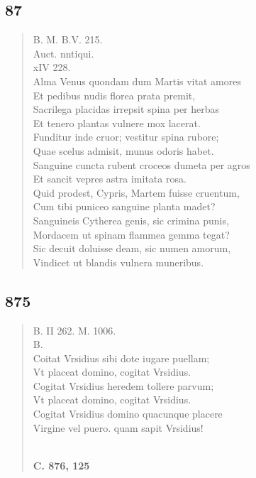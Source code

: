 \documentclass[11pt, a4paper]{report}
\begin{document}
            \subsection*{87}
      \begin{verse}
      B. M. B.V. 215. \\ Auct. nntiqui. \\ xIV 228. \\ Alma Venus  \lbrack quondam \rbrack  dum Martis vitat amores \\ Et pedibus nudis florea prata premit, \\ Sacrilega placidas irrepsit spina per herbas \\ Et tenero plantas vulnere mox lacerat. \\ Funditur inde cruor; vestitur spina rubore; \\ Quae scelus admisit, munus odoris habet. \\ Sanguine cuncta rubent croceos dumeta per agros \\ Et sancit vepres astra imitata rosa. \\ Quid prodest, Cypris, Martem fuisse cruentum, \\ Cum tibi puniceo sanguine planta madet? \\ Sanguineis Cytherea genis, sic crimina punis, \\ Mordacem ut spinam flammea gemma tegat? \\ Sic decuit doluisse deam, sic numen amorum, \\ Vindicet ut blandis vulnera muneribus. \\ 
      \end{verse}
  
            \subsection*{875}
      \begin{verse}
      B. II 262. M. 1006. \\ B. \\ Coitat Vrsidius sibi dote iugare puellam; \\ Vt placeat domino, cogitat Vrsidius. \\ Cogitat Vrsidius heredem tollere parvum; \\ Vt placeat domino, cogitat Vrsidius. \\ Cogitat Vrsidius domino quacunque placere \\ Virgine vel puero. quam sapit Vrsidius! \\ 
        ﻿\pagebreak 
    \begin{center} \textbf{C. 876, 125} \end{center} \marginpar{[326]}  \marginpar{[40]} 
      \end{verse}
  
\end{document}
